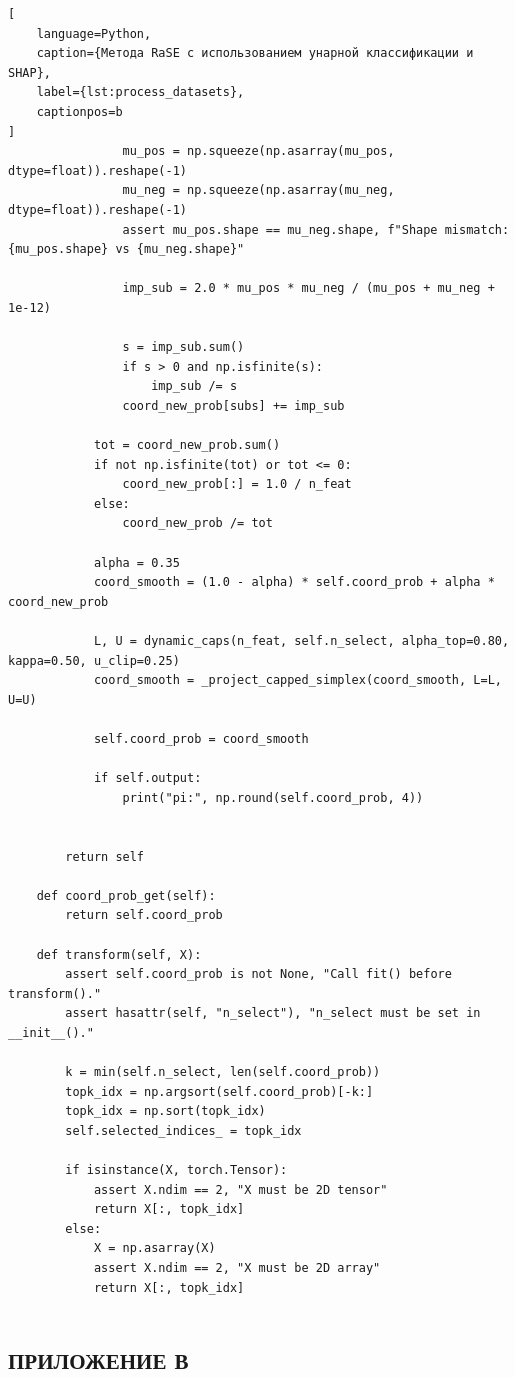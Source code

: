 \documentclass[12pt,a4paper]{article}
\begin{document}
\begin{lstlisting}[
    language=Python,
    caption={Метода RaSE с использованием унарной классификации и SHAP},
    label={lst:process_datasets},
    captionpos=b
]
                mu_pos = np.squeeze(np.asarray(mu_pos, dtype=float)).reshape(-1)
                mu_neg = np.squeeze(np.asarray(mu_neg, dtype=float)).reshape(-1)
                assert mu_pos.shape == mu_neg.shape, f"Shape mismatch: {mu_pos.shape} vs {mu_neg.shape}"

                imp_sub = 2.0 * mu_pos * mu_neg / (mu_pos + mu_neg + 1e-12)

                s = imp_sub.sum()
                if s > 0 and np.isfinite(s):
                    imp_sub /= s
                coord_new_prob[subs] += imp_sub

            tot = coord_new_prob.sum()
            if not np.isfinite(tot) or tot <= 0:
                coord_new_prob[:] = 1.0 / n_feat
            else:
                coord_new_prob /= tot

            alpha = 0.35
            coord_smooth = (1.0 - alpha) * self.coord_prob + alpha * coord_new_prob

            L, U = dynamic_caps(n_feat, self.n_select, alpha_top=0.80, kappa=0.50, u_clip=0.25)
            coord_smooth = _project_capped_simplex(coord_smooth, L=L, U=U)

            self.coord_prob = coord_smooth

            if self.output:
                print("pi:", np.round(self.coord_prob, 4))


        return self

    def coord_prob_get(self):
        return self.coord_prob

    def transform(self, X):
        assert self.coord_prob is not None, "Call fit() before transform()."
        assert hasattr(self, "n_select"), "n_select must be set in __init__()."

        k = min(self.n_select, len(self.coord_prob))
        topk_idx = np.argsort(self.coord_prob)[-k:]
        topk_idx = np.sort(topk_idx)
        self.selected_indices_ = topk_idx

        if isinstance(X, torch.Tensor):
            assert X.ndim == 2, "X must be 2D tensor"
            return X[:, topk_idx]
        else:
            X = np.asarray(X)
            assert X.ndim == 2, "X must be 2D array"
            return X[:, topk_idx]


\end{lstlisting}

\subsection*{ПРИЛОЖЕНИЕ В}
\end{document}
